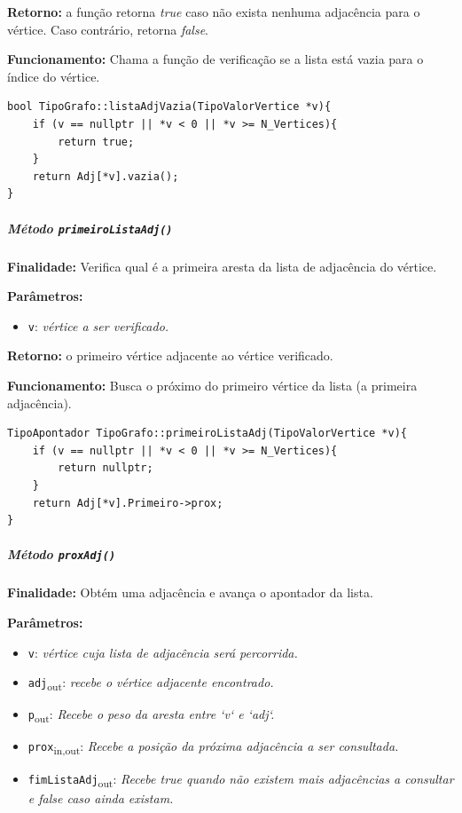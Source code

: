 \documentclass{article}
\begin{document}
    \textbf{Retorno:} a função retorna \textit{true} caso não exista nenhuma adjacência para o vértice. Caso contrário, retorna \textit{false}.

    \textbf{Funcionamento:} Chama a função de verificação se a lista está vazia para o índice do vértice.

\begin{verbatim}
bool TipoGrafo::listaAdjVazia(TipoValorVertice *v){
    if (v == nullptr || *v < 0 || *v >= N_Vertices){
        return true;
    }
    return Adj[*v].vazia();
}
\end{verbatim}

\subparagraph{Método \texttt{primeiroListaAdj()}}

    \mbox{}\par
    \noindent
    \textbf{Finalidade:} Verifica qual é a primeira aresta da lista de adjacência do vértice.

    \textbf{Parâmetros:}
    \begin{itemize}
       \item \texttt{v}: \textit{vértice a ser verificado.}
    \end{itemize}

    \textbf{Retorno:} o primeiro vértice adjacente ao vértice verificado.

    \textbf{Funcionamento:} Busca o próximo do primeiro vértice da lista (a primeira adjacência).

\begin{verbatim}
TipoApontador TipoGrafo::primeiroListaAdj(TipoValorVertice *v){
    if (v == nullptr || *v < 0 || *v >= N_Vertices){
        return nullptr;
    }
    return Adj[*v].Primeiro->prox;
}
\end{verbatim}

\subparagraph{Método \texttt{proxAdj()}}

    \mbox{}\par
    \noindent
    \textbf{Finalidade:} Obtém uma adjacência e avança o apontador da lista.

    \textbf{Parâmetros:}
    \begin{itemize}
       \item \texttt{v}: \textit{vértice cuja lista de adjacência será percorrida.}

        \item \texttt{adj}\textsubscript{out}: \textit{recebe o vértice adjacente encontrado.}

        \item \texttt{p}\textsubscript{out}: \textit{Recebe o peso da aresta entre `v` e `adj`.}

        \item \texttt{prox}\textsubscript{in,out}: \textit{Recebe a posição da próxima adjacência a ser consultada.}

        \item \texttt{fimListaAdj}\textsubscript{out}: \textit{Recebe true quando não existem mais adjacências a consultar e false caso ainda existam.}
        
    \end{itemize}
\end{document}
